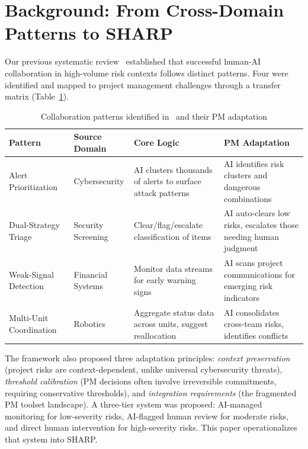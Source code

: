 \documentclass[runningheads]{llncs}
\begin{document}
\section{Background: From Cross-Domain Patterns to SHARP}

Our previous systematic review~\cite{bara2025catania} established that successful human-AI collaboration in high-volume risk contexts follows distinct patterns. Four were identified and mapped to project management challenges through a transfer matrix (Table~\ref{tab:patterns}).

\begin{table}[htbp]
\caption{Collaboration patterns identified in~\cite{bara2025catania} and their PM adaptation}
\label{tab:patterns}
\begin{tabularx}{\textwidth}{|p{2.2cm}|p{2.2cm}|>{\raggedright\arraybackslash}X|>{\raggedright\arraybackslash}X|}
\hline
\textbf{Pattern} & \textbf{Source Domain} & \textbf{Core Logic} & \textbf{PM Adaptation} \\
\hline
Alert Prioritization~\cite{alertpriority2024} & Cybersecurity & AI clusters thousands of alerts to surface attack patterns & AI identifies risk clusters and dangerous combinations \\
\hline
Dual-Strategy Triage~\cite{humanloop2025} & Security Screening & Clear/flag/escalate classification of items & AI auto-clears low risks, escalates those needing human judgment \\
\hline
Weak-Signal Detection~\cite{weaksignal2022} & Financial Systems & Monitor data streams for early warning signs & AI scans project communications for emerging risk indicators \\
\hline
Multi-Unit Coordination~\cite{robotmission2024} & Robotics & Aggregate status data across units, suggest reallocation & AI consolidates cross-team risks, identifies conflicts \\
\hline
\end{tabularx}
\end{table}

The framework also proposed three adaptation principles: \emph{context preservation} (project risks are context-dependent, unlike universal cybersecurity threats), \emph{threshold calibration} (PM decisions often involve irreversible commitments, requiring conservative thresholds), and \emph{integration requirements} (the fragmented PM toolset landscape). A three-tier system was proposed: AI-managed monitoring for low-severity risks, AI-flagged human review for moderate risks, and direct human intervention for high-severity risks. This paper operationalizes that system into SHARP.
\end{document}
